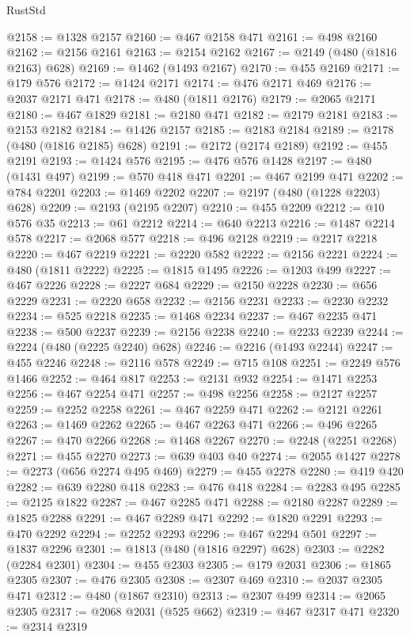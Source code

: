 \begin{lexlean}{RustStd}
\begin{coremodule}
{\begin{coremodule}
{{{{{{{{{{{{{{{{{{{{{{{{{{{{{{{{{@2158 := @1328 @2157
@2160 := @467 @2158 @471
@2161 := @498 @2160
@2162 := @2156 @2161
@2163 := @2154 @2162
@2167 := @2149 (@480 (@1816 @2163) @628)
@2169 := @1462 (@1493 @2167)
@2170 := @455 @2169
@2171 := @179 @576
@2172 := @1424 @2171
@2174 := @476 @2171 @469
@2176 := @2037 @2171 @471
@2178 := @480 (@1811 @2176)
@2179 := @2065 @2171
@2180 := @467 @1829
@2181 := @2180 @471
@2182 := @2179 @2181
@2183 := @2153 @2182
@2184 := @1426 @2157
@2185 := @2183 @2184
@2189 := @2178 (@480 (@1816 @2185) @628)
@2191 := @2172 (@2174 @2189)
@2192 := @455 @2191
@2193 := @1424 @576
@2195 := @476 @576 @1428
@2197 := @480 (@1431 @497)
@2199 := @570 @418 @471
@2201 := @467 @2199 @471
@2202 := @784 @2201
@2203 := @1469 @2202
@2207 := @2197 (@480 (@1228 @2203) @628)
@2209 := @2193 (@2195 @2207)
@2210 := @455 @2209
@2212 := @10 @576 @35
@2213 := @61 @2212
@2214 := @640 @2213
@2216 := @1487 @2214 @578
@2217 := @2068 @577
@2218 := @496 @2128
@2219 := @2217 @2218
@2220 := @467 @2219
@2221 := @2220 @582
@2222 := @2156 @2221
@2224 := @480 (@1811 @2222)
@2225 := @1815 @1495
@2226 := @1203 @499
@2227 := @467 @2226
@2228 := @2227 @684
@2229 := @2150 @2228
@2230 := @656 @2229
@2231 := @2220 @658
@2232 := @2156 @2231
@2233 := @2230 @2232
@2234 := @525 @2218
@2235 := @1468 @2234
@2237 := @467 @2235 @471
@2238 := @500 @2237
@2239 := @2156 @2238
@2240 := @2233 @2239
@2244 := @2224 (@480 (@2225 @2240) @628)
@2246 := @2216 (@1493 @2244)
@2247 := @455 @2246
@2248 := @2116 @578
@2249 := @715 @108
@2251 := @2249 @576 @1466
@2252 := @464 @817
@2253 := @2131 @932
@2254 := @1471 @2253
@2256 := @467 @2254 @471
@2257 := @498 @2256
@2258 := @2127 @2257
@2259 := @2252 @2258
@2261 := @467 @2259 @471
@2262 := @2121 @2261
@2263 := @1469 @2262
@2265 := @467 @2263 @471
@2266 := @496 @2265
@2267 := @470 @2266
@2268 := @1468 @2267
@2270 := @2248 (@2251 @2268)
@2271 := @455 @2270
@2273 := @639 @403 @40
@2274 := @2055 @1427
@2278 := @2273 (@656 @2274 @495 @469)
@2279 := @455 @2278
@2280 := @419 @420
@2282 := @639 @2280 @418
@2283 := @476 @418
@2284 := @2283 @495
@2285 := @2125 @1822
@2287 := @467 @2285 @471
@2288 := @2180 @2287
@2289 := @1825 @2288
@2291 := @467 @2289 @471
@2292 := @1820 @2291
@2293 := @470 @2292
@2294 := @2252 @2293
@2296 := @467 @2294 @501
@2297 := @1837 @2296
@2301 := @1813 (@480 (@1816 @2297) @628)
@2303 := @2282 (@2284 @2301)
@2304 := @455 @2303
@2305 := @179 @2031
@2306 := @1865 @2305
@2307 := @476 @2305
@2308 := @2307 @469
@2310 := @2037 @2305 @471
@2312 := @480 (@1867 @2310)
@2313 := @2307 @499
@2314 := @2065 @2305
@2317 := @2068 @2031 (@525 @662)
@2319 := @467 @2317 @471
@2320 := @2314 @2319
}}}}}}}}}}}}}}}}}}}}}}}}}}}}}}}}}
\end{coremodule}}
\end{coremodule}
\end{lexlean}
